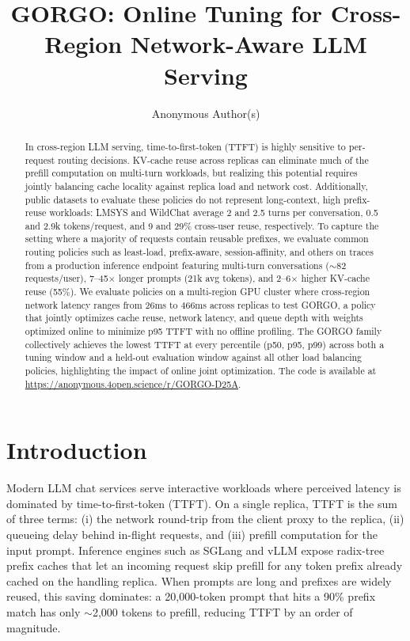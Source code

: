 \documentclass{article}
\title{GORGO: Online Tuning for Cross-Region Network-Aware LLM Serving}
\author{Anonymous Author(s)}
\begin{document}
\maketitle

\begin{abstract}
In cross-region LLM serving, time-to-first-token (TTFT) is highly sensitive to
per-request routing decisions. KV-cache reuse across replicas can eliminate much
of the prefill computation on multi-turn workloads, but realizing this potential
requires jointly balancing cache locality against replica load and network cost.
Additionally, public datasets to evaluate these policies do not represent
long-context, high prefix-reuse workloads: LMSYS and WildChat average 2 and 2.5
turns per conversation, 0.5 and 2.9k tokens/request, and 9 and 29\% cross-user
reuse, respectively. To capture the setting where a majority of requests contain
reusable prefixes, we evaluate common routing policies such as least-load,
prefix-aware, session-affinity, and others on traces from a production inference
endpoint featuring multi-turn conversations (${\sim}82$ requests/user),
7--45$\times$ longer prompts (21k avg tokens), and 2--6$\times$ higher KV-cache
reuse (55\%). We evaluate policies on a multi-region GPU cluster where
cross-region network latency ranges from 26ms to 466ms across replicas to test
GORGO, a policy that jointly optimizes cache reuse, network latency, and queue
depth with weights optimized online to minimize p95 TTFT with no offline
profiling. The GORGO family collectively achieves the lowest TTFT at every
percentile (p50, p95, p99) across both a tuning window and a held-out evaluation
window against all other load balancing policies, highlighting the impact of
online joint optimization. The code is available at \href{https://anonymous.4open.science/r/GORGO-D25A}{https://anonymous.4open.science/r/GORGO-D25A}.
\end{abstract}

\section{Introduction}
\label{sec:intro}

Modern LLM chat services serve interactive workloads where perceived latency is
dominated by time-to-first-token (TTFT). On a single replica, TTFT is the sum
of three terms: (i) the network round-trip from the client proxy to the replica,
(ii) queueing delay behind in-flight requests, and (iii) prefill computation for
the input prompt. Inference engines such as SGLang \citep{sglang2024} and vLLM
\citep{vllm2023} expose radix-tree prefix caches that let an incoming request
skip prefill for any token prefix already cached on the handling replica. When
prompts are long and prefixes are widely reused, this saving dominates: a
20{,}000-token prompt that hits a 90\% prefix match has only $\sim$2{,}000 tokens
to prefill, reducing TTFT by an order of magnitude.
\end{document}
